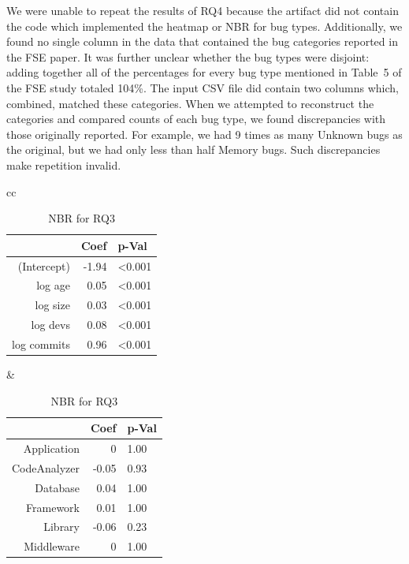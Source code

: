 \documentclass[acmsmall]{acmart}
\begin{document}
We were unable to repeat the results of RQ4 because the artifact did not
contain the code which implemented the heatmap or NBR for bug
types. Additionally, we found no single column in the data that contained
the bug categories reported in the FSE paper. It was further unclear whether
the bug types were disjoint: adding together all of the percentages for
every bug type mentioned in Table~5 of the FSE study totaled 104\%.  The
input CSV file did contain two columns which, combined, matched these
categories. When we attempted to reconstruct the categories and compared
counts of each bug type, we found discrepancies with those originally
reported.  For example, we had 9 times as many Unknown bugs as the original,
but we had only less than half Memory bugs.  Such discrepancies make
repetition invalid.

\begin{table}[!h]\centering \caption{NBR for RQ3}
\begin{tabular}{cc}
\begin{minipage}{4.5cm}\begin{tabular}{@{}r|rl@{}}  \hline
  \rule{0pt}{3ex} & Coef & p-Val \\ \hline \hline
(Intercept) & -1.94 & <0.001 \\ 
  log age & ~0.05 & <0.001 \\ 
  log size & ~0.03 & <0.001 \\ 
  log devs & ~0.08 & <0.001 \\ 
  log commits & ~0.96 &<0.001 \\  \hline \hline
\end{tabular}
\end{minipage}&\begin{minipage}{4.5cm}
\begin{tabular}{@{}r|rl@{}}  \hline
  \rule{0pt}{3ex} & Coef & p-Val \\ \hline \hline
Application & ~0 & 1.00 \\ 
  CodeAnalyzer & -0.05 & 0.93 \\ 
  Database & ~0.04 & 1.00 \\ 
  Framework & ~0.01 & 1.00 \\ 
  Library & -0.06 & 0.23 \\ 
  Middleware & ~0 & 1.00 \\    \hline
\end{tabular}\end{minipage}
\end{tabular}
\label{domainNBR}
\end{table}
\end{document}
